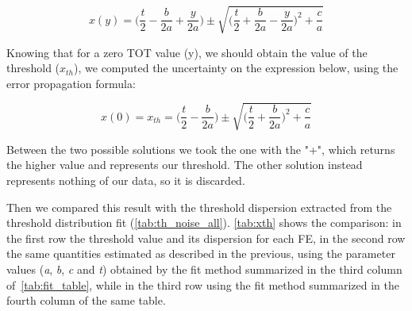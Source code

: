 \begin{equation}
x(y) = \bigg(\frac{t}{2} - \frac{b}{2a} + \frac{y}{2a}\bigg) \pm \sqrt{\bigg(\frac{t}{2} + \frac{b}{2a} - \frac{y}{2a}\bigg)^{2} + \frac{c}{a}}
\end{equation}

Knowing that for a zero TOT value (y), we should obtain the value of the threshold ($x_{th}$), we computed the uncertainty on the expression below, using the error propagation formula:

\begin{equation}
x(0) = x_{th} = \bigg(\frac{t}{2} - \frac{b}{2a}\bigg) \pm \sqrt{\bigg(\frac{t}{2} + \frac{b}{2a}\bigg)^{2} + \frac{c}{a}}
\label{eq:xth_merit}
\end{equation}

Between the two possible solutions we took the one with the "+", which returns the higher value and represents our threshold. The other solution instead represents nothing of our data, so it is discarded.

Then we compared this result with the threshold dispersion extracted from the threshold distribution fit (\autoref{tab:th_noise_all}). \autoref{tab:xth} shows the comparison: in the first row the threshold value and its dispersion for each FE, in the second row the same quantities estimated as described in the previous, using the parameter values (\textit{a}, \textit{b}, \textit{c} and \textit{t}) obtained by the fit method summarized in the third column of~\autoref{tab:fit_table}, while in the third row using the fit method summarized in the fourth column of the same table.

